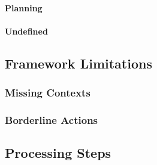 \paragraph{Planning}
\paragraph{Undefined}
\subsection{Framework Limitations}
\subsubsection{Missing Contexts}
\subsubsection{Borderline Actions}
\subsection{Processing Steps}
